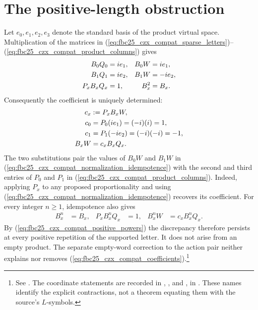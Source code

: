 \documentclass{article}
\begin{document}
\section{The positive-length obstruction}

Let $e_0,e_1,e_2,e_3$ denote the standard basis of the product virtual space. Multiplication of the matrices in
(\ref{eq:fbc25_czx_compat_sparse_letters})--(\ref{eq:fbc25_czx_compat_product_columns}) gives
\begin{align}
    B_0Q_0    & =i e_1, & B_0W  & =i e_1, \notag  \\
    B_1Q_1    & =i e_2, & B_1W  & =-i e_2, \notag \\
    P_xB_xQ_x & =1,     & B_x^2 & =B_x.
    \label{eq:fbc25_czx_compat_normalization_idempotence}
\end{align}
Consequently the coefficient is uniquely determined:
\begin{align}
    c_x  & :=P_xB_xW, \label{eq:fbc25_czx_compat_coefficients} \\
    c_0  & =P_0(ie_1)=(-i)(i)=1, \notag      \\
    c_1  & =P_1(-ie_2)=(-i)(-i)=-1, \notag   \\
    B_xW & =c_xB_xQ_x. \notag
\end{align}
The two substitutions pair the values of $B_0W$ and $B_1W$ in
(\ref{eq:fbc25_czx_compat_normalization_idempotence}) with the second and third
entries of $P_0$ and $P_1$ in
(\ref{eq:fbc25_czx_compat_product_columns}).
Indeed, applying $P_x$ to any proposed proportionality and using
(\ref{eq:fbc25_czx_compat_normalization_idempotence}) recovers its coefficient. For every integer $n\geq1$, idempotence also gives
\begin{align}
    B_x^n & =B_x,
          & P_xB_x^nQ_x & =1,
          & B_x^nW      & =c_xB_x^nQ_x.
    \label{eq:fbc25_czx_compat_positive_powers}
\end{align}
By (\ref{eq:fbc25_czx_compat_positive_powers}) the discrepancy therefore persists at every positive repetition of the supported letter. It does not arise from an empty product. The separate empty-word correction to the action pair neither explains nor removes
(\ref{eq:fbc25_czx_compat_coefficients}).\footnote{See
    . The coordinate statements are recorded in
    ,
    , and
    , in
    .
    These names identify the explicit contractions, not a theorem equating them with the source's $L$-symbols.}
\end{document}
